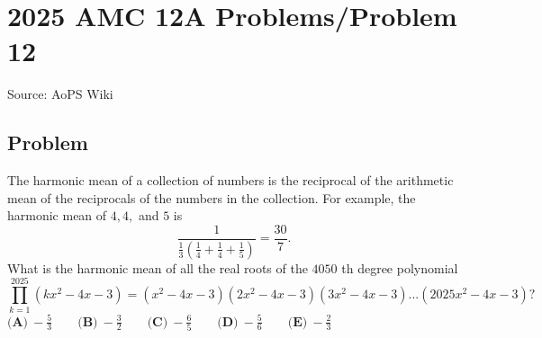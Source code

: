 \documentclass[12pt]{article}
\begin{document}
\section*{{2025 AMC 12A Problems/Problem 12}}
Source: AoPS Wiki

\subsection*{Problem}
The harmonic mean of a collection of numbers is the reciprocal of the arithmetic mean of the reciprocals of the numbers in the collection. For example, the harmonic mean of $4,4,$ and $5$ is \[\frac{1}{\frac{1}{3}(\frac{1}{4}+\frac{1}{4}+\frac{1}{5})}=\frac{30}{7}.\] What is the harmonic mean of all the real roots of the $4050$ th degree polynomial \[\prod_{k=1}^{2025} (kx^2-4x-3)=(x^2-4x-3)(2x^2-4x-3)(3x^2-4x-3)...(2025x^2-4x-3)?\] $\textbf{(A)}~-\frac{5}{3}\qquad\textbf{(B)}~-\frac{3}{2}\qquad\textbf{(C)}~-\frac{6}{5}\qquad\textbf{(D)}~-\frac{5}{6}\qquad\textbf{(E)}~-\frac{2}{3}$
\end{document}
